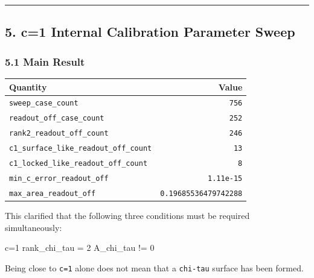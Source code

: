 \documentclass[
]{article}
\newenvironment{Shaded}{}{}
\newcommand{\NormalTok}[1]{#1}
\newcounter{none} %
\begin{document}
\begin{center}\rule{0.5\linewidth}{0.5pt}\end{center}

\subsection{5. c=1 Internal Calibration Parameter
Sweep}\label{c1-internal-calibration-parameter-sweep}

\subsubsection{5.1 Main Result}\label{main-result-3}

{\def\LTcaptype{none} %
\begin{longtable}[]{@{}lr@{}}
\toprule\noalign{}
Quantity & Value \\
\midrule\noalign{}
\endhead
\bottomrule\noalign{}
\endlastfoot
\texttt{sweep\_case\_count} & \texttt{756} \\
\texttt{readout\_off\_case\_count} & \texttt{252} \\
\texttt{rank2\_readout\_off\_count} & \texttt{246} \\
\texttt{c1\_surface\_like\_readout\_off\_count} & \texttt{13} \\
\texttt{c1\_locked\_like\_readout\_off\_count} & \texttt{8} \\
\texttt{min\_c\_error\_readout\_off} & \texttt{1.11e-15} \\
\texttt{max\_area\_readout\_off} & \texttt{0.19685536479742288} \\
\end{longtable}
}

This clarified that the following three conditions must be required
simultaneously:

\begin{Shaded}
\begin{Highlighting}[]
\NormalTok{c=1}
\NormalTok{rank\_chi\_tau = 2}
\NormalTok{A\_chi\_tau != 0}
\end{Highlighting}
\end{Shaded}

Being close to \texttt{c=1} alone does not mean that a \texttt{chi-tau}
surface has been formed.
\end{document}
